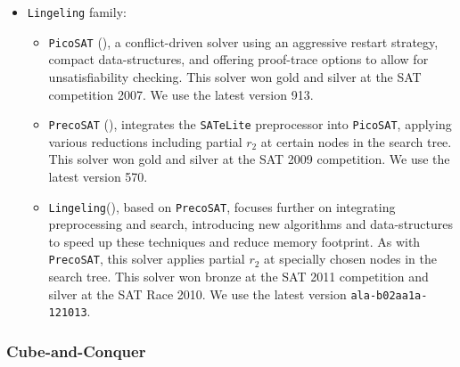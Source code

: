 \documentclass[final,3p,times]{elsarticle}
\theoremstyle{definition}
\newcommand{\minisat}{\texttt{MiniSat}}
\newcommand{\cryptomini}{\texttt{CryptoMiniSat}}
\newcommand{\glucose}{\texttt{Glucose}}
\newcommand{\picosat}{\texttt{PicoSAT}}
\newcommand{\precosat}{\texttt{PrecoSAT}}
\newcommand{\lingeling}{\texttt{Lingeling}}
\begin{document}
\begin{itemize}
\begin{itemize}
\begin{itemize}
    \item \cryptomini{} (\cite{CryptoSAT2009}), a \minisat{} derivative designed specifically to tackle hard cryptographic problems. This solver won gold at SAT Race 2010 and gold and silver at the SAT competition 2011. We use version 2.9.6.
    \item \glucose{} (\cite{AudemardSimon2009PredictingLearnt}), a \minisat{} derivative utilising a new clause scoring scheme and aggressive learnt-clause deletion. This solver won gold in both SAT 2011 competition and SAT Challenge 2012. We use versions 2.0 and 2.2.
    \end{itemize}
  \item \lingeling{} family:
    \begin{itemize}
    \item \picosat{} (\cite{Biere2008picosat}), a conflict-driven solver using an aggressive restart strategy, compact data-structures, and offering proof-trace options to allow for unsatisfiability checking. This solver won gold and silver at the SAT competition 2007. We use the latest version 913.
    \item \precosat{} (\cite{Biere2009Precosat}), integrates the \texttt{SATeLite} preprocessor into \picosat{}, applying various reductions including partial $r_2$ at certain nodes in the search tree. This solver won gold and silver at the SAT 2009 competition. We use the latest version 570.
    \item \lingeling (\cite{Biere2012LingelingDesc}), based on \precosat, focuses further on integrating preprocessing and search, introducing new algorithms and data-structures to speed up these techniques and reduce memory footprint. As with \precosat, this solver applies partial $r_2$ at specially chosen nodes in the search tree. This solver won bronze at the SAT 2011 competition and silver at the SAT Race 2010. We use the latest version \texttt{ala-b02aa1a-121013}.
    \end{itemize}
  \end{itemize}
\end{itemize}



\subsubsection{Cube-and-Conquer}
\label{sec:cubeconq}
\end{document}
